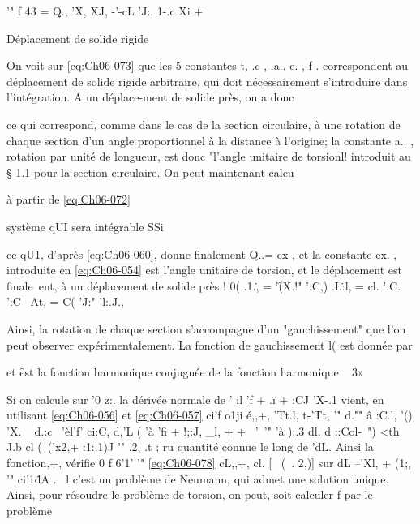'" 
\label{eq:Ch07-073} 
f 43 = Q., 'X, XJ, 	-'-cL 'J:, 1-.c Xi + { 
Déplacement de solide rigide 

On voit sur \eqref{eq:Ch06-073} que les 5 constantes t, .c , .a.. e. , f . correspondent au déplacement de solide rigide arbitraire, qui doit nécessairement s'introduire dans l'intégration. A un déplace-ment de solide près, on a donc 


ce qui correspond, comme dans le cas de la section circulaire, à une rotation de chaque section d'un angle proportionnel à la distance à l'origine; la cons­tante a.. , rotation par unité de longueur, est donc "l'angle unitaire de tor­sionl! introduit au § 1.1 pour la section circulaire. On peut maintenant calcu­

à partir de \eqref{eq:Ch06-072} 
\label{eq:Ch07-075} 

système qUI sera intégrable SSi 


ce qU1, d'après \eqref{eq:Ch06-060}, donne finalement Q..= ex , et la constante ex. , introduite en \eqref{eq:Ch06-054} est l'angle unitaire de torsion, et le déplacement est finale~ent, à un déplacement de solide près 
! 
0(
.1.\., = '\f (X.!" ':C,) 
\label{eq:Ch07-076} 
.I.\.:l, = cl. ':C. ':C~ 
At, = C( 'J:" 'l:.J., 

Ainsi, la rotation de chaque section s'accompagne d'un "gauchissement" que l'on peut observer expérimentalement. La fonction de gauchissement l( est donnée par 
\label{eq:Ch07-077} 


et \f est la fonction harmonique conjuguée de la fonction harmonique 
~\label{eq:Ch07-003} 3» 

Si 	on calcule sur '0 z:. la dérivée normale de \fl ' il
'f + 	.ï + :CJ
'X-.1 
vient, en utilisant \eqref{eq:Ch06-056} et \eqref{eq:Ch06-057} 
ci'f o1ji é,,+,
'Tt.l, t-'Tt,
'" 
d."" â :C.l, '() 'X. ~ d.:c~ 'èl'f' ci:C, d,'L
( 'à 'fi 	+ !;:J, _l,
+ 	+ ~'\
'" 	'à ):.3 dl. d ::Col-~") <th J.b cl (~('x2,+ :1:.1)J
'" .2, .t ;
ru 
quantité connue le long de 'dL. Ainsi la fonction,+, vérifie 
0
f 	6'1' '" 
\eqref{eq:Ch06-078} 	cL,,+, cl. [~ (~. 2,)] sur dL
--'Xl, + (1;,
'" 
ci'1\. dA .~
l 
c'est un problème de Neumann, qui admet une solution unique. Ainsi, pour résoudre le problème de torsion, on peut, soit calculer f par le problème 

}
